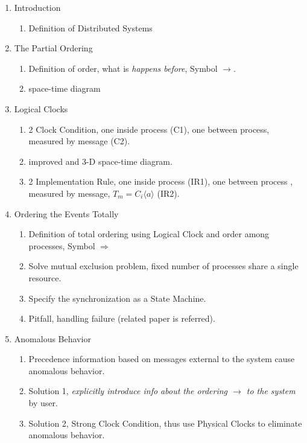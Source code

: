 \documentclass[12pt,a4paper,oneside]{article}
\begin{document}
\begin{enumerate}
  \item Introduction
  \begin{enumerate}
    \item Definition of Distributed Systems
  \end{enumerate}
  \item The Partial Ordering
  \begin{enumerate}
      \item Definition of order, what is \textit{happens before}, Symbol $\rightarrow$. %
      \item space-time diagram
  \end{enumerate}
  \item Logical Clocks
  \begin{enumerate}
      \item 2 Clock Condition, one inside process (C1), one between process, measured by message (C2).
      \item improved and 3-D space-time diagram.
      \item 2 Implementation Rule, one inside process (IR1), one between process , measured by message, $T_m = C_i\langle a \rangle$ (IR2).
  \end{enumerate}
  \item Ordering the Events Totally
  \begin{enumerate}
      \item Definition of total ordering using Logical Clock and order among processes, Symbol $\Rightarrow$
      \item Solve mutual exclusion problem, fixed number of processes share a single resource.
      \item Specify the synchronization as a State Machine.
      \item Pitfall, handling failure (related paper is referred).
  \end{enumerate}
  \item Anomalous Behavior
  \begin{enumerate}
      \item Precedence information based on messages external to the system cause anomalous behavior.
      \item Solution 1, \textit{explicitly introduce info about the ordering $\rightarrow$ to the system} by user.
      \item Solution 2, Strong Clock Condition, thus use Physical Clocks to eliminate anomalous behavior.

\end{enumerate}
\end{enumerate}
\end{document}

